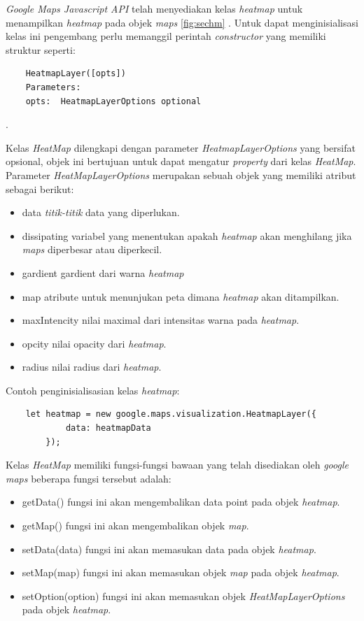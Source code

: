 \textit{Google Maps Javascript API} telah menyediakan kelas \textit{heatmap} untuk menampilkan \textit{heatmap} pada objek \textit{maps} \ref{fig:sechm} . Untuk dapat menginisialisasi kelas ini pengembang perlu memanggil perintah \textit{constructor} yang memiliki struktur seperti:
\begin{lstlisting}
    HeatmapLayer([opts])
    Parameters: 
    opts:  HeatmapLayerOptions optional
\end{lstlisting}.

Kelas \textit{HeatMap} dilengkapi dengan parameter \textit{HeatmapLayerOptions} yang bersifat opsional, objek ini  bertujuan untuk dapat mengatur \textit{property} dari kelas \textit{HeatMap}. Parameter \textit{HeatMapLayerOptions} merupakan sebuah objek yang memiliki atribut sebagai berikut:

\begin{itemize}
    \item data \textit{titik-titik} data yang diperlukan.
    \item dissipating variabel yang menentukan apakah \textit{heatmap} akan menghilang jika \textit{maps} diperbesar atau diperkecil.
    \item gardient gardient dari warna \textit{heatmap}
    \item map atribute untuk menunjukan peta dimana \textit{heatmap} akan ditampilkan.
    \item maxIntencity nilai maximal dari intensitas warna pada \textit{heatmap}.
    \item opcity nilai opacity dari \textit{heatmap}.
    \item radius nilai radius dari \textit{heatmap}.
\end{itemize}
Contoh penginisialisasian kelas \textit{heatmap}:
\begin{lstlisting}
    let heatmap = new google.maps.visualization.HeatmapLayer({
            data: heatmapData
        });
\end{lstlisting}
Kelas \textit{HeatMap} memiliki fungsi-fungsi bawaan yang telah disediakan oleh \textit{google maps} beberapa fungsi tersebut adalah:
\begin{itemize}
    \item getData() fungsi ini akan mengembalikan data point pada objek \textit{heatmap}.
    \item getMap() fungsi ini akan mengembalikan objek \textit{map}.
    \item setData(data) fungsi ini akan memasukan data pada objek \textit{heatmap}.
    \item setMap(map) fungsi ini akan memasukan objek \textit{map} pada objek \textit{heatmap}.
    \item setOption(option) fungsi ini akan memasukan  objek \textit{HeatMapLayerOptions} pada objek \textit{heatmap}.
\end{itemize}